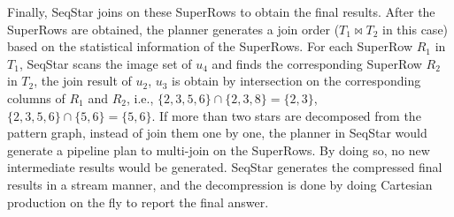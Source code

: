 Finally, SeqStar joins on these SuperRows to obtain the final results.
After the SuperRows are obtained,
the planner generates a join order ($T_1 \Join T_2$ in this case) based on the statistical information of the SuperRows.
For each SuperRow $R_1$ in $T_1$, SeqStar scans the image set of $u_4$ and finds the corresponding SuperRow $R_2$ in $T_2$,
the join result of $u_2$, $u_3$ is obtain by intersection on the corresponding columns of $R_1$ and $R_2$,
i.e., $\{2, 3, 5, 6\} \cap \{2, 3, 8\} = \{2, 3\}$, $\{2, 3, 5, 6\} \cap \{5, 6\} = \{5, 6\}$.
If more than two stars are decomposed from the pattern graph,
instead of join them one by one,
the planner in SeqStar would generate a pipeline plan to multi-join on the SuperRows.
By doing so, no new intermediate results would be generated.
SeqStar generates the compressed final results in a stream manner,
and the decompression is done by doing Cartesian production on the fly to report the final answer.


